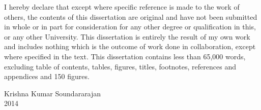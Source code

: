 
\begin{declaration} %

I hereby declare that except where specific reference is made to the work of others, the contents of this dissertation are original and have not been submitted in whole or in part for consideration for any other degree or qualification in this, or any other University. This dissertation is entirely the result of my own work and includes nothing which is the outcome of work done in collaboration, except where specified in the text. This dissertation contains less than 65,000 words, excluding table of contents, tables, figures, titles, footnotes, references and appendices and 150 figures.

\flushright

Krishna Kumar Soundararajan\\
2014
\end{declaration}

